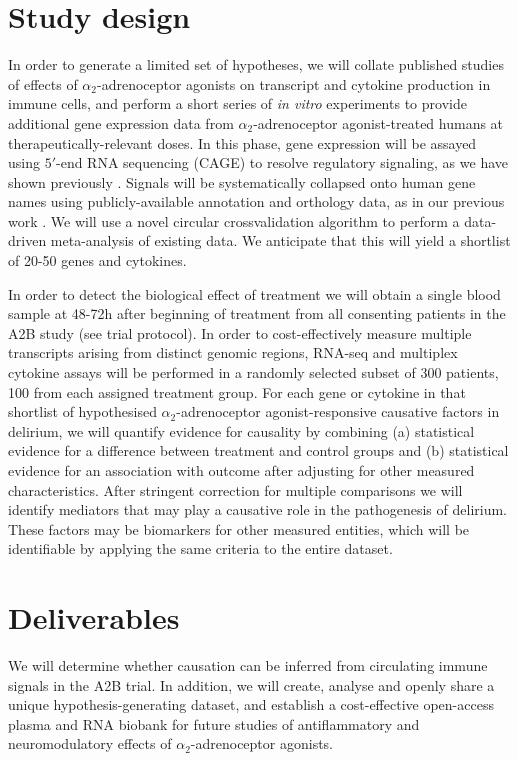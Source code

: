 \documentclass[a4paper,11pt,onecolumn]{IEEEtran}
\newcommand{\ataa}{$\alpha_2$-adrenoceptor agonist\xspace}
\newcommand{\ataas}{$\alpha_2$-adrenoceptor agonists\xspace}
\begin{document}
\section*{Study design}
In order to generate a limited set of hypotheses, we will collate published studies of effects of \ataas on transcript and cytokine production in immune cells, and perform a short series of \emph{in vitro} experiments to provide additional gene expression data from \ataa-treated humans at therapeutically-relevant doses. In this phase, gene expression will be assayed using $5'$-end RNA sequencing (CAGE) to resolve regulatory signaling, as we have shown previously%
. Signals will be systematically collapsed onto human gene names using publicly-available annotation and orthology data, as in our previous work %
. We will use a novel circular crossvalidation algorithm to perform a data-driven meta-analysis of existing data. We anticipate that this will yield a shortlist of 20-50 genes and cytokines.\par
In order to detect the biological effect of treatment we will obtain a single blood sample at 48-72h after beginning of treatment from all consenting patients in the A2B study (see trial protocol). In order to cost-effectively measure multiple transcripts arising from distinct genomic regions, RNA-seq and multiplex cytokine assays will be performed in a randomly selected subset of 300 patients, 100 from each assigned treatment group. For each gene or cytokine in that shortlist of hypothesised \ataa-responsive causative factors in delirium, we will quantify evidence for causality by combining (a) statistical evidence for a difference between treatment and control groups and (b) statistical evidence for an association with outcome after adjusting for other measured characteristics. After stringent correction for multiple comparisons we will identify mediators that may play a causative role in the pathogenesis of delirium. These factors may be biomarkers for other measured entities, which will be identifiable by applying the same criteria to the entire dataset. 
\par

\section*{Deliverables}
We will determine whether causation can be inferred from circulating immune signals in the A2B trial. In addition, we will create, analyse and openly share a unique hypothesis-generating dataset, and establish a cost-effective open-access plasma and RNA biobank for future studies of antiflammatory and neuromodulatory effects of \ataas. \par

\printbibliography
\end{document}
